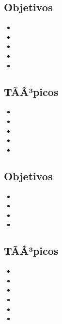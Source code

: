 \subsection*{Objetivos}
\begin{itemize}
	\item \ALSIETEObjUNO
	\item \ALSIETEObjDOS
	\item \ALSIETEObjTRES
	\item \ALSIETEObjCUATRO
	\item \ALSIETEObjCINCO
\end{itemize}

\subsection{\ALOCHODef}\label{sec:BOK-AL8}

\subsection*{TÃÂ³picos}
\begin{itemize}
	\item \ALOCHOTopicAnalisis
	\item \ALOCHOTopicAlgoritmos
	\item \ALOCHOTopicAlgoritmosaleatorios
	\item \ALOCHOTopicProgramacion
	\item \ALOCHOTopicOptimizacion
\end{itemize}

\subsection*{Objetivos}
\begin{itemize}
	\item \ALOCHOObjUNO
	\item \ALOCHOObjDOS
	\item \ALOCHOObjTRES
	\item \ALOCHOObjCUATRO
\end{itemize}

\subsection{\ALNUEVEDef}\label{sec:BOK-AL9}

\subsection*{TÃÂ³picos}
\begin{itemize}
	\item \ALNUEVETopicRevision
	\item \ALNUEVETopicCriptografia
	\item \ALNUEVETopicCriptografiade
	\item \ALNUEVETopicFirmas
	\item \ALNUEVETopicProtocolos
	\item \ALNUEVETopicAplicaciones
\end{itemize}

